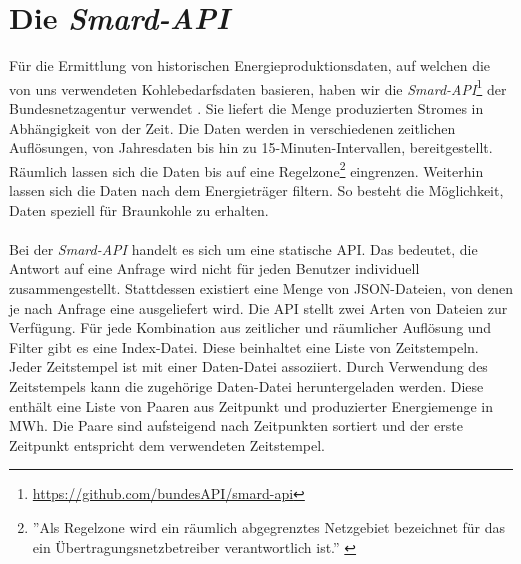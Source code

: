\section{Die \emph{Smard-API}}

Für die Ermittlung von historischen Energieproduktionsdaten, auf welchen die von uns verwendeten Kohlebedarfsdaten basieren, haben wir die \emph{Smard-API}\footnote{\url{https://github.com/bundesAPI/smard-api}} der Bundesnetzagentur verwendet \cite{noauthor_bundesapismard-api_nodate}. Sie liefert die Menge produzierten Stromes in Abhängigkeit von der Zeit. Die Daten werden in verschiedenen zeitlichen Auflösungen, von Jahresdaten bis hin zu 15-Minuten-Intervallen, bereitgestellt. Räumlich lassen sich die Daten bis auf eine Regelzone\footnote{''Als Regelzone wird ein räumlich abgegrenztes Netzgebiet bezeichnet für das ein Übertragungsnetzbetreiber verantwortlich ist.'' \cite{noauthor_smard_nodate}} eingrenzen. Weiterhin lassen sich die Daten nach dem Energieträger filtern. So besteht die Möglichkeit, Daten speziell für Braunkohle zu erhalten.\\
\\
Bei der \emph{Smard-API} handelt es sich um eine statische API. Das bedeutet, die Antwort auf eine Anfrage wird nicht für jeden Benutzer individuell zusammengestellt. Stattdessen existiert eine Menge von JSON-Dateien, von denen je nach Anfrage eine ausgeliefert wird. Die API stellt zwei Arten von Dateien zur Verfügung. Für jede Kombination aus zeitlicher und räumlicher Auflösung und Filter gibt es eine Index-Datei. Diese beinhaltet eine Liste von Zeitstempeln. Jeder Zeitstempel ist mit einer Daten-Datei assoziiert. Durch Verwendung des Zeitstempels kann die zugehörige Daten-Datei heruntergeladen werden. Diese enthält eine Liste von Paaren aus Zeitpunkt und produzierter Energiemenge in MWh. Die Paare sind aufsteigend nach Zeitpunkten sortiert und der erste Zeitpunkt entspricht dem verwendeten Zeitstempel.